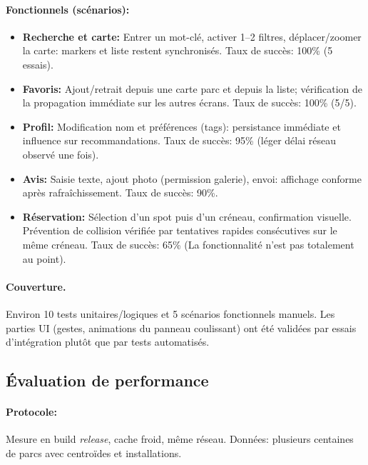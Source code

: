 \documentclass[12pt,a4paper]{article}
\begin{document}
\paragraph{Fonctionnels (scénarios):}
\begin{itemize}
  \item \textbf{Recherche et carte:} Entrer un mot-clé, activer 1--2 filtres, déplacer/zoomer la carte: markers et liste restent synchronisés. Taux de succès: 100\% (5 essais).
  \item \textbf{Favoris:} Ajout/retrait depuis une carte parc et depuis la liste; vérification de la propagation immédiate sur les autres écrans. Taux de succès: 100\% (5/5).
  \item \textbf{Profil:} Modification nom et préférences (tags): persistance immédiate et influence sur recommandations. Taux de succès: 95\% (léger délai réseau observé une fois).
  \item \textbf{Avis:} Saisie texte, ajout photo (permission galerie), envoi: affichage conforme après rafraîchissement. Taux de succès: 90\%.
  \item \textbf{Réservation:} Sélection d’un spot puis d’un créneau, confirmation visuelle. Prévention de collision vérifiée par tentatives rapides consécutives sur le même créneau. Taux de succès: 65\% (La fonctionnalité n'est pas totalement au point).
\end{itemize}

\paragraph{Couverture.}
Environ 10 tests unitaires/logiques et 5 scénarios fonctionnels manuels. Les parties UI (gestes, animations du panneau coulissant) ont été validées par essais d’intégration plutôt que par tests automatisés.

\subsection{Évaluation de performance}

\paragraph{Protocole:}
Mesure en build \emph{release}, cache froid, même réseau. Données: plusieurs centaines de parcs avec centroïdes et installations.
\end{document}
